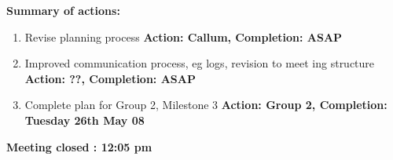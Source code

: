 \documentclass{letter}
\begin{document}
\textbf{Summary of actions:}
\begin{enumerate}
  \item Revise planning process \textbf{Action: Callum, Completion: ASAP}
  \item Improved communication process, eg logs, revision to meet
 ing structure \textbf{Action: ??, Completion: ASAP}
  \item Complete plan for Group 2, Milestone 3 \textbf{Action: Group 2,
  Completion: Tuesday 26th May 08}
\end{enumerate}

\textbf{Meeting closed : 12:05 pm }
\end{document}
